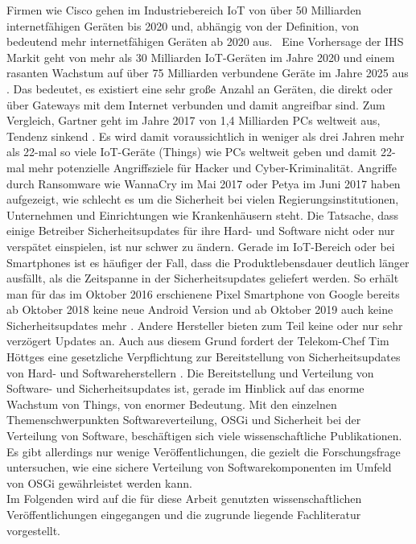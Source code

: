 \glqq Firmen wie Cisco gehen im Industriebereich IoT von über 50 Milliarden internetfähigen Geräten bis 2020 und,
abhängig von der Definition, von bedeutend mehr internetfähigen Geräten ab 2020 aus.\grqq\ \cite{osgi_iot_und_mobile}
Eine Vorhersage der IHS Markit geht von mehr als 30 Milliarden IoT-Geräten im Jahre 2020 und einem rasanten Wachstum auf über 75 Milliarden verbundene Geräte im Jahre 2025 aus \cite{ihs_iot_devices}.
Das bedeutet, es existiert eine sehr große Anzahl an Geräten, die direkt oder über Gateways mit dem Internet verbunden und damit angreifbar sind.
Zum Vergleich, Gartner geht im Jahre 2017 von 1,4 Milliarden PCs weltweit aus, Tendenz sinkend \cite{gartner_pcs}. 
Es wird damit voraussichtlich in weniger als drei Jahren mehr als 22-mal so viele \ac{IoT}-Geräte (Things) wie PCs weltweit geben und damit 22-mal mehr potenzielle Angriffsziele für Hacker 
und Cyber-Kriminalität.
Angriffe durch Ransomware wie WannaCry im Mai 2017 oder Petya im Juni 2017 haben aufgezeigt, wie schlecht es um die Sicherheit bei vielen Regierungsinstitutionen, Unternehmen
und Einrichtungen wie Krankenhäusern steht. Die Tatsache, dass einige Betreiber Sicherheitsupdates für ihre Hard- und Software nicht oder nur verspätet einspielen, ist nur schwer zu ändern.
Gerade im \ac{IoT}-Bereich oder bei Smartphones ist es häufiger der Fall, dass die Produktlebensdauer deutlich länger ausfällt, als die Zeitspanne in der Sicherheitsupdates geliefert werden.
So erhält man für das im Oktober 2016 erschienene Pixel Smartphone von Google bereits ab Oktober 2018 keine neue Android Version
und ab Oktober 2019 auch keine Sicherheitsupdates mehr \cite{heise_google_updates}. 
Andere Hersteller bieten zum Teil keine oder nur sehr verzögert Updates an.
Auch aus diesem Grund fordert der Telekom-Chef Tim Höttges eine gesetzliche Verpflichtung zur Bereitstellung von Sicherheitsupdates von Hard- und Softwareherstellern \cite{faz_telekom}.
Die Bereitstellung und Verteilung von Software- und Sicherheitsupdates ist, gerade im Hinblick auf das enorme Wachstum von Things, von enormer Bedeutung.
Mit den einzelnen Themenschwerpunkten Softwareverteilung, \ac{OSGi} und Sicherheit bei der Verteilung von Software, beschäftigen sich viele wissenschaftliche Publikationen.
Es gibt allerdings nur wenige Veröffentlichungen, die gezielt die Forschungsfrage untersuchen, wie eine sichere Verteilung von Softwarekomponenten im Umfeld von \ac{OSGi}
gewährleistet werden kann.\\

Im Folgenden wird auf die für diese Arbeit genutzten wissenschaftlichen Veröffentlichungen eingegangen und die zugrunde liegende Fachliteratur vorgestellt.


